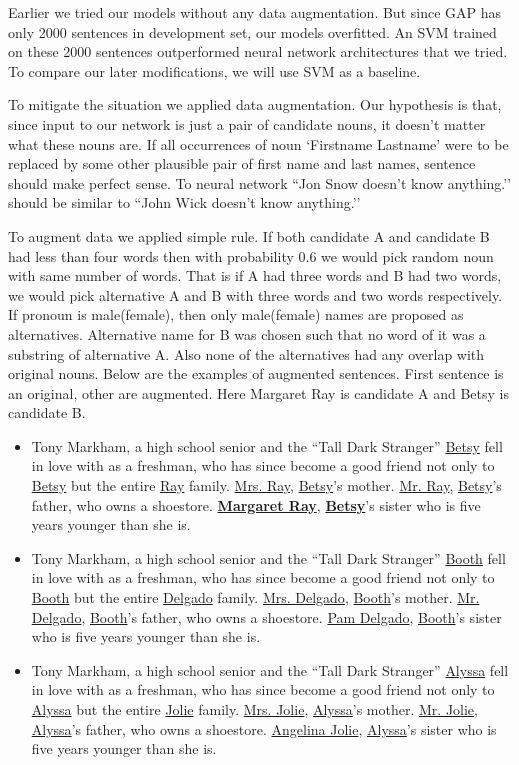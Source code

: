 \documentclass[11pt,a4paper]{article}
\begin{document}
Earlier we tried our models without any data augmentation. But since GAP has only 2000 sentences in development set, our models overfitted. An SVM trained on these 2000 sentences outperformed neural network architectures that we tried. To compare our later modifications, we will use SVM as a baseline.

To mitigate the situation we applied data augmentation. Our hypothesis is that, since input to our network is just a pair of candidate nouns, it doesn’t matter what these nouns are. If all occurrences of noun `Firstname Lastname’ were to be replaced by some other plausible pair of first name and last names, sentence should make perfect sense. To neural network ``Jon Snow doesn’t know anything.’’ should be similar to ``John Wick doesn’t know anything.’’ 

To augment data we applied simple rule. If both candidate A and candidate B had less than four words then with probability 0.6 we would pick random noun with same number of words. That is if A had three words and B had two words, we would pick alternative A and B with three words and two words respectively. If pronoun is male(female), then only male(female) names are proposed as alternatives. Alternative name for B was chosen such that no word of it was a substring of alternative A. Also none of the alternatives had any overlap with original nouns. Below are the examples of augmented sentences. First sentence is an original, other are augmented. Here Margaret Ray is candidate A and Betsy is candidate B.

\begin{itemize}
\item Tony Markham, a high school senior and the ``Tall Dark Stranger'' \underline{Betsy} fell in love with as a freshman, who has since become a good friend not only to \underline{Betsy} but the entire \underline{Ray} family. \underline{Mrs. Ray}, \underline{Betsy}'s mother. \underline{Mr. Ray}, \underline{Betsy}'s father, who owns a shoestore. \textbf{\underline{Margaret Ray}}, \textbf{\underline{Betsy}}'s sister who is five years younger than she is.
  
\item Tony Markham, a high school senior and the ``Tall Dark Stranger'' \underline{Booth} fell in love with as a freshman, who has since become a good friend not only to \underline{Booth} but the entire \underline{Delgado} family. \underline{Mrs. Delgado}, \underline{Booth}'s mother. \underline{Mr. Delgado}, \underline{Booth}'s father, who owns a shoestore. \underline{Pam Delgado}, \underline{Booth}'s sister who is five years younger than she is.

\item Tony Markham, a high school senior and the ``Tall Dark Stranger'' \underline{Alyssa} fell in love with as a freshman, who has since become a good friend not only to \underline{Alyssa} but the entire \underline{Jolie} family. \underline{Mrs. Jolie}, \underline{Alyssa}'s mother. \underline{Mr. Jolie}, \underline{Alyssa}'s father, who owns a shoestore. \underline{Angelina Jolie}, \underline{Alyssa}'s sister who is five years younger than she is.
\end{itemize}
\end{document}
